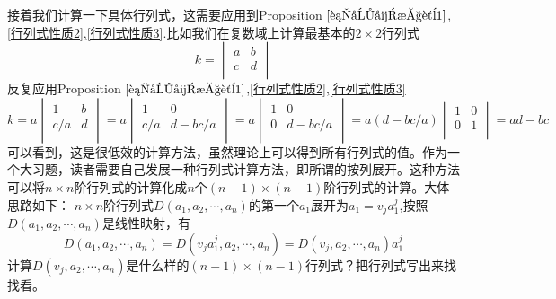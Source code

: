 \documentclass[11pt,a4paper,openany]{book}%
\theoremstyle{plain}%
\newcommand{\pref}[1]{{\rm Proposition} $\ref{#1}$}
\begin{document}
\indent 接着我们计算一下具体行列式，这需要应用到\pref{行列式性质1},\ref{行列式性质2},\ref{行列式性质3}.比如我们在复数域上计算最基本的$2\times 2$行列式
\[
k=\begin{vmatrix}
a & b\\
c & d\\
\end{vmatrix}
\]
反复应用\pref{行列式性质1},\ref{行列式性质2},\ref{行列式性质3}
\[
k=a\begin{vmatrix}
1 & b\\
c/a & d\\
\end{vmatrix}
=a\begin{vmatrix}
1 & 0\\
c/a & d-bc/a\\
\end{vmatrix}
=a\begin{vmatrix}
1 & 0\\
0 & d-bc/a\\
\end{vmatrix}
=a(d-bc/a)\begin{vmatrix}
1 & 0\\
0 & 1\\
\end{vmatrix}
=ad-bc
\]
可以看到，这是很低效的计算方法，虽然理论上可以得到所有行列式的值。作为一个大习题，读者需要自己发展一种行列式计算方法，即所谓的按列展开。这种方法可以将$n\times n$阶行列式的计算化成$n$个$(n-1)\times (n-1)$阶行列式的计算。大体思路如下：
$n\times n$阶行列式$D(a_1,a_2,\cdots,a_n)$的第一个$a_1$展开为$a_1=v_ja_1^j$,按照$D(a_1,a_2,\cdots,a_n)$是线性映射，有
\[
D(a_1,a_2,\cdots,a_n)=D(v_ja_1^j,a_2,\cdots,a_n)=D(v_j,a_2,\cdots,a_n)a_1^j
\]
计算$D(v_j,a_2,\cdots,a_n)$是什么样的$(n-1)\times (n-1)$行列式？把行列式写出来找找看。
\end{document}
